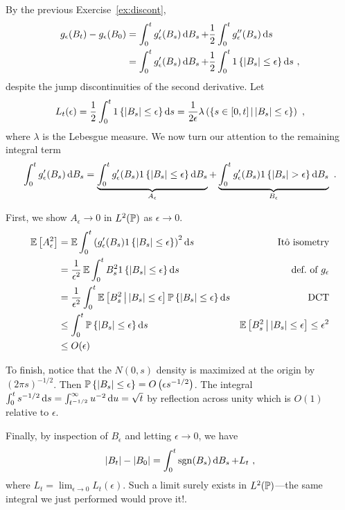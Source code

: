 \documentclass{article}
\begin{document}
    By the previous Exercise~\ref{ex:discont},
    \begin{align*}
      g_\epsilon(B_t)-g_\epsilon(B_0)&=\int_0^tg_\epsilon'(B_s)\d{B_s}+\frac{1}{2}\int_0^tg_\epsilon''(B_s)\d{s}\\
      &=\int_0^tg_\epsilon'(B_s)\d{B_s}+\frac{1}{2}\int_0^t1\ca{\abs{B_s}\le\epsilon}\d{s}\,\,,
    \end{align*}
    despite the jump discontinuities of the second derivative. Let
    \[
      L_t(\epsilon)=\frac{1}{2}\int_0^t1\ca{\abs{B_s}\le\epsilon}\d{s}=\frac{1}{2\epsilon}\lambda\pa{\set{s\in[0,t]}{\abs{B_s}\le \epsilon}}\,\,,
    \]
    where \(\lambda\) is the Lebesgue measure. We now turn our attention to the remaining integral term
    \[
      \int_0^tg_\epsilon'(B_s)\d{B_s}=\underbrace{\int_0^tg_\epsilon'(B_s)1\ca{\abs{B_s}\le\epsilon}\d{B_s}}_{A_\epsilon}+\underbrace{\int_0^tg_\epsilon'(B_s)1\ca{\abs{B_s}>\epsilon}\d{B_s}}_{B_\epsilon}\,\,.
    \]

    First, we show \(A_\epsilon\rightarrow 0\) in \(L^2(\P)\) as \(\epsilon\rightarrow 0\).
    \begin{align*}
      \E\ha{A_\epsilon^2}
      &=\E\int_0^t\pa{g_\epsilon'(B_s)1\ca{\abs{B_s}\le \epsilon}}^2\d{s} & \text{It\^{o} isometry}\\
      &=\frac{1}{\epsilon^2}\E\int_0^tB_s^21\ca{\abs{B_s}\le \epsilon}\d{s} & \text{def.~of } g_\epsilon\\
      &=\frac{1}{\epsilon^2}\int_0^t\CE{B_s^2}{\abs{B_s}\le \epsilon}\P\ca{\abs{B_s}\le \epsilon}\d{s} & \text{DCT}\\ 
      &\le \int_0^t\P\ca{\abs{B_s}\le \epsilon}\d{s} & \CE{B_s^2}{\abs{B_s}\le \epsilon}\le\epsilon^2\\
      &\le O(\epsilon)
    \end{align*}

    To finish, notice that the \(N(0,s)\) density is maximized at the origin by \((2\pi s)^{-1/2}\). Then \(\P\ca{\abs{B_s}\le \epsilon}=O\pa{\epsilon s^{-1/2}}\). The integral \(\int_0^ts^{-1/2}\d{s}=\int_{t^{-1/2}}^\infty u^{-2}\d{u}=\sqrt{t}\) by reflection across unity which is \(O(1)\) relative to \(\epsilon\).

    Finally, by inspection of \(B_\epsilon\) and letting \(\epsilon\rightarrow 0\), we have
    \[
      \abs{B_t}-\abs{B_0}=\int_0^t\sgn(B_s)\d{B_s}+L_t\,\,,
    \]
    where \(L_t=\lim_{\epsilon\rightarrow 0}L_t(\epsilon)\). Such a limit surely exists in \(L^2(\P)\)---the same integral we just performed would prove it!.
\end{document}
